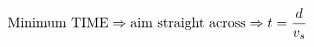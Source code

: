 \documentclass[preview]{standalone}
\begin{document}
\begin{align*}
\special{dvisvgm:raw <g id='unique000'>}\text{Minimum TIME} \Rightarrow \text{aim straight across} \Rightarrow t = \frac{d}{v_s}\special{dvisvgm:raw </g>}
\end{align*}
\end{document}
